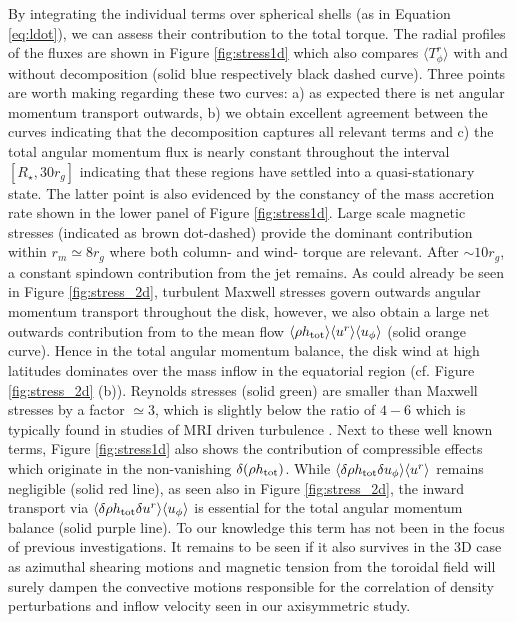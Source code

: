 \documentclass[fleqn,usenatbib]{mnras}
\newcommand{\rstar}{\ensuremath{R_{\star}}}
\begin{document}
By integrating the individual terms over spherical shells (as in Equation \ref{eq:ldot}), we can assess their contribution to the total torque.  The radial profiles of the fluxes are shown in Figure \ref{fig:stress1d} which also compares $\langle T^r_\phi\rangle$ with and without decomposition (solid blue respectively black dashed curve).  Three points are worth making regarding these two curves:  a) as expected there is net angular momentum transport outwards, b) we obtain excellent agreement between the curves indicating that the decomposition captures all relevant terms and c) the total angular momentum flux is nearly constant throughout the interval $[\rstar,30r_g]$ indicating that these regions have settled into a quasi-stationary state.  The latter point is also evidenced by the constancy of the mass accretion rate shown in the lower panel of Figure \ref{fig:stress1d}.
Large scale magnetic stresses (indicated as brown dot-dashed) provide the dominant contribution within $r_m\simeq8r_g$ where both column- and wind- torque are relevant.  After $\sim10r_g$, a constant spindown contribution from the jet remains.  
As could already be seen in Figure \ref{fig:stress_2d}, turbulent Maxwell stresses govern outwards angular momentum transport throughout the disk, however, we also obtain a large net outwards contribution from to the mean flow $\langle \rho h_{\rm tot}\rangle \langle u^r \rangle\langle u_\phi\rangle$ (solid orange curve).  Hence in the total angular momentum balance, the disk wind at high latitudes dominates over the mass inflow in the equatorial region (cf. Figure \ref{fig:stress_2d} (b)).  Reynolds stresses (solid green) are smaller than Maxwell stresses by a factor $\simeq 3$, which is slightly below the ratio of $4-6$ which is typically found in studies of MRI driven turbulence \citep[e.g.][]{HawleyGammieEtAl1995,PessahEtAl2006,BlackmanPennaEtAl2008,ShiStoneEtAl2016}.  
Next to these well known terms, Figure \ref{fig:stress1d} also shows the contribution of compressible effects which originate in the non-vanishing $\delta(\rho h_{\rm tot})$.  While $\langle \delta \rho h_{\rm tot}\delta u_\phi\rangle \langle u^r\rangle$ remains negligible (solid red line), as seen also in Figure \ref{fig:stress_2d}, the inward transport via $\langle \delta \rho h_{\rm tot}\delta u^r\rangle \langle u_\phi\rangle$ is essential for the total angular momentum balance (solid purple line).  
To our knowledge this term has not been in the focus of previous investigations. It remains to be seen if it also survives in the 3D case as azimuthal shearing motions and magnetic tension from the toroidal field will surely dampen the convective motions responsible for the correlation of density perturbations and inflow velocity seen in our axisymmetric study.
\end{document}
